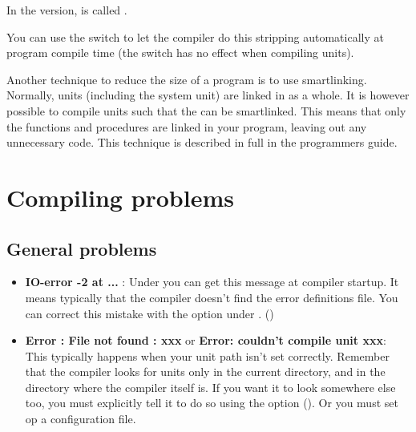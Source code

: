 \documentclass{book}
\begin{document}
\begin{remark}
In the \win version,  is called .
\end{remark}
You can use the  switch to let the compiler do this stripping
automatically at program compile time (the switch has no effect when
compiling units).

Another technique to reduce the size of a program is to use smartlinking.
Normally, units (including the system unit) are linked in as a whole.
It is however possible to compile units such that the can be smartlinked.
This means that only the functions and procedures are linked in your
program, leaving out any unnecessary code. This technique is described in
full in the programmers guide.

\chapter{Compiling problems}

\section{General problems}
\begin{itemize}
\item \textbf{IO-error -2 at ...} : Under \linux you can get this message at
compiler startup. It means typically that the compiler doesn't find the
error definitions file. You can correct this mistake with the 
option under \linux. ()
\item \textbf {Error : File not found : xxx} or \textbf{Error: couldn't compile
unit xxx}: This typically happens when
your unit path isn't set correctly. Remember that the compiler looks for
units only in the current directory, and in the directory where the compiler
itself is. If you want it to look somewhere else too, you must explicitly
tell it to do so using the  option (). Or you must set op
a configuration file.
\end{itemize}

\end{document}
